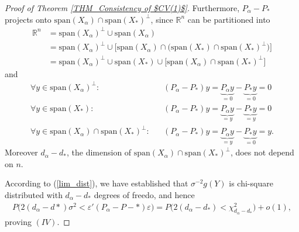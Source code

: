 \documentclass[Research_Module_ES.tex]{subfiles}
\begin{document}
\begin{proof}[Proof of Theorem \ref{THM_Consistency of $CV(1)$}]
Furthermore, $P_\alpha-P_\ast$ projects onto $\mathrm{span}(X_\alpha)\cap \mathrm{span}(X_\ast)^\bot$, since $\mathbb{R}^n$ can be partitioned into
\begin{align}
\mathbb{R}^n&=\mathrm{span}(X_\alpha)^\bot \cup\mathrm{span}(X_\alpha)\nonumber\\
&=\mathrm{span}(X_\alpha)^\bot \cup\bigl[\mathrm{span}(X_\alpha)\cap \bigl(\mathrm{span}(X_\ast)\cap \mathrm{span}(X_\ast)^\bot\bigr)\bigr]\\
&=\mathrm{span}(X_\alpha)^\bot \cup \mathrm{span}(X_\ast) \cup \bigl[\mathrm{span}(X_\alpha)\cap \mathrm{span}(X_\ast)^\bot\bigr]\nonumber
\end{align} 
and
\begin{align}
\forall y\in \mathrm{span}(X_\alpha)^\bot: && (P_\alpha-P_\ast)y=\underbrace{P_\alpha y}_{=0}-\underbrace{P_\ast y}_{=0}=0\nonumber\\
\forall y\in \mathrm{span}(X_\ast): && (P_\alpha-P_\ast)y=\underbrace{P_\alpha y}_{=y}-\underbrace{P_\ast y}_{=y}=0\label{projection_end}\\
\forall y\in \mathrm{span}(X_\alpha)\cap \mathrm{span}(X_\ast)^\bot: && (P_\alpha-P_\ast)y=\underbrace{P_\alpha y}_{=y}-\underbrace{P_\ast y}_{=0}=y.\nonumber
\end{align}
Moreover $d_\alpha-d_\ast$, the dimension of $\mathrm{span}(X_\alpha)\cap \mathrm{span}(X_\ast)^\bot$, does not depend on $n$.

According to (\ref{lim_dist}), we have established that $\sigma^{-2}g(Y)$ is chi-square distributed with $d_\alpha-d_\ast$ degrees of freedo, and hence
\begin{align*}
P\bigl(2(d_\alpha-d\ast)\sigma^2 < \varepsilon'(P_\alpha-P-\ast)\varepsilon\bigr)
=P\bigl(2(d_\alpha-d_\ast)<\chi_{d_\alpha-d_\ast}^2\bigr)+o(1),
\end{align*}
proving $(IV)$.
\end{proof}
\end{document}
